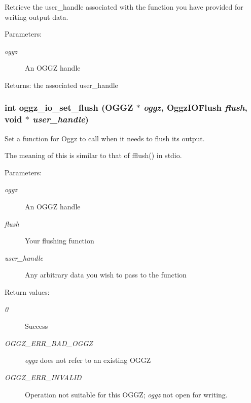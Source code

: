 Retrieve the user\_\-handle associated with the function you have provided for writing output data. 

\begin{Desc}
\item[Parameters:]
\begin{description}
\item[{\em oggz}]An OGGZ handle \end{description}
\end{Desc}
\begin{Desc}
\item[Returns:]the associated user\_\-handle \end{Desc}
\subsubsection{\setlength{\rightskip}{0pt plus 5cm}int oggz\_\-io\_\-set\_\-flush ({\bf OGGZ} $\ast$ {\em oggz}, {\bf Oggz\-IOFlush} {\em flush}, void $\ast$ {\em user\_\-handle})}\label{oggz__io_8h_a13}


Set a function for Oggz to call when it needs to flush its output. 

The meaning of this is similar to that of fflush() in stdio.

\begin{Desc}
\item[Parameters:]
\begin{description}
\item[{\em oggz}]An OGGZ handle \item[{\em flush}]Your flushing function \item[{\em user\_\-handle}]Any arbitrary data you wish to pass to the function \end{description}
\end{Desc}
\begin{Desc}
\item[Return values:]
\begin{description}
\item[{\em 0}]Success \item[{\em OGGZ\_\-ERR\_\-BAD\_\-OGGZ}]{\em oggz\/} does not refer to an existing OGGZ \item[{\em OGGZ\_\-ERR\_\-INVALID}]Operation not suitable for this OGGZ; {\em oggz\/} not open for writing. \end{description}
\end{Desc}

